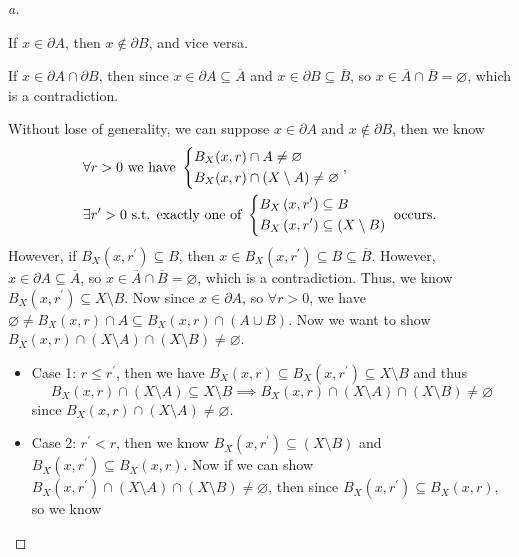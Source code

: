 \begin{proof}[a]
  \begin{claim}
    If \(x \in \partial A\), then \(x \notin \partial B\), and vice versa.   
  \end{claim}
  \begin{explanation}
    If \(x \in \partial A \cap \partial B\), then since \(x \in \partial A \subseteq \overline{A} \) and \(x \in \partial B \subseteq \overline{B} \), so \(x \in \overline{A} \cap \overline{B} = \varnothing  \), which is a contradiction.     
  \end{explanation}
  Without lose of generality, we can suppose \(x \in \partial A\) and \(x \notin \partial B\), then we know 
  \begin{align*}
    &\forall r > 0 \text{ we have }
    \begin{dcases}
      B_X(x, r) \cap A \neq \varnothing \\
      B_X(x, r) \cap \left( X \setminus A \right) \neq \varnothing
    \end{dcases}, \\
    &\exists r^{\prime} > 0 \text{ s.t. exactly one of } 
    \begin{dcases}
      B_X \left( x, r^{\prime}  \right) \subseteq B \\
      B_X \left( x, r^{\prime}  \right) \subseteq (X\setminus B)
    \end{dcases} \text{ occurs.}
  \end{align*}
  However, if \(B_X \left( x, r^{\prime}  \right) \subseteq B  \), then \(x \in B_X \left( x, r^{\prime}  \right) \subseteq B \subseteq \overline{B}  \). However, \(x \in \partial A \subseteq \overline{A} \), so \(x \in \overline{A} \cap \overline{B} = \varnothing   \), which is a contradiction. Thus, we know \(B_X \left( x, r^{\prime}  \right) \subseteq X\setminus B \). Now since \(x \in \partial A\), so \(\forall r > 0\), we have \(\varnothing \neq B_X (x, r) \cap A \subseteq B_X(x, r) \cap (A \cup B)\). Now we want to show \(B_X(x, r) \cap (X \setminus A) \cap (X \setminus B) \neq \varnothing \).  
  \begin{itemize}
    \item Case 1: \(r \le r^{\prime} \), then we have \(B_X(x, r) \subseteq B_X \left( x, r^{\prime}  \right) \subseteq X \setminus B\) and thus 
    \[
      B_X (x, r) \cap \left( X \setminus A \right) \subseteq X \setminus B \implies B_X(x, r) \cap \left( X \setminus A \right) \cap \left( X \setminus B \right) \neq \varnothing    
    \] since \(B_X(x, r) \cap \left( X \setminus A \right) \neq \varnothing  \). 
    \item Case 2: \(r^{\prime} < r\), then we know \(B_X \left( x, r^{\prime}  \right) \subseteq (X \setminus B) \) and \(B_X \left( x, r^{\prime}  \right) \subseteq B_X(x, r) \). Now if we can show \(B_X \left( x, r^{\prime}  \right) \cap (X \setminus A) \cap (X \setminus B) \neq \varnothing \), then since \(B_X \left( x, r^{\prime}  \right) \subseteq B_X(x, r)\), so we know 

\end{itemize}
\end{proof}
